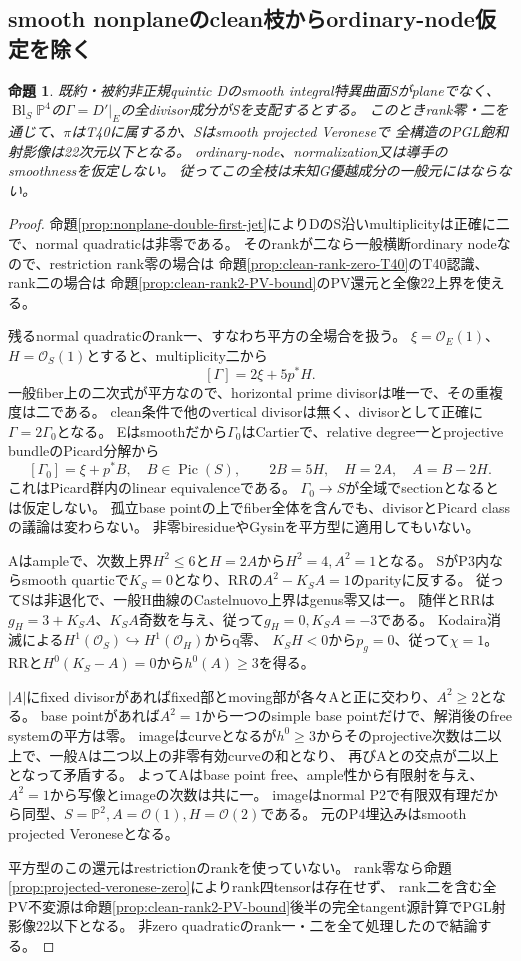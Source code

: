 \documentclass[a4paper,11pt]{ltjsarticle}
\newtheorem{proposition}{命題}[section]
\theoremstyle{definition}
\begin{document}
\subsection{smooth nonplaneのclean枝からordinary-node仮定を除く}
\begin{proposition}\label{prop:smooth-nonplane-clean-all}
既約・被約非正規quintic Dのsmooth integral特異曲面Sがplaneでなく、
$\operatorname{Bl}_S\mathbb P^4$の$\Gamma=D'|_E$の全divisor成分がSを支配するとする。
このときrank零・二を通じて、$\pi$はT40に属するか、Sはsmooth projected Veroneseで
全構造のPGL飽和射影像は22次元以下となる。
ordinary-node、normalization又は導手のsmoothnessを仮定しない。
従ってこの全枝は未知G優越成分の一般元にはならない。
\end{proposition}
\begin{proof}
命題\ref{prop:nonplane-double-first-jet}によりDのS沿いmultiplicityは正確に二で、normal quadraticは非零である。
そのrankが二なら一般横断ordinary nodeなので、restriction rank零の場合は
命題\ref{prop:clean-rank-zero-T40}のT40認識、rank二の場合は
命題\ref{prop:clean-rank2-PV-bound}のPV還元と全像22上界を使える。

残るnormal quadraticのrank一、すなわち平方の全場合を扱う。
$\xi=\mathcal O_E(1)$、$H=\mathcal O_S(1)$とすると、multiplicity二から
\[
 [\Gamma]=2\xi+5p^*H.
\]
一般fiber上の二次式が平方なので、horizontal prime divisorは唯一で、その重複度は二である。
clean条件で他のvertical divisorは無く、divisorとして正確に$\Gamma=2\Gamma_0$となる。
Eはsmoothだから$\Gamma_0$はCartierで、relative degree一とprojective bundleのPicard分解から
\[
 [\Gamma_0]=\xi+p^*B,\quad B\in\operatorname{Pic}(S),\qquad
 2B=5H,\quad H=2A,\quad A=B-2H.
\]
これはPicard群内のlinear equivalenceである。
$\Gamma_0\to S$が全域でsectionとなるとは仮定しない。
孤立base pointの上でfiber全体を含んでも、divisorとPicard classの議論は変わらない。
非零biresidueやGysinを平方型に適用してもいない。

Aはampleで、次数上界$H^2\le6$と$H=2A$から$H^2=4,A^2=1$となる。
SがP3内ならsmooth quarticで$K_S=0$となり、RRの$A^2-K_SA=1$のparityに反する。
従ってSは非退化で、一般H曲線のCastelnuovo上界はgenus零又は一。
随伴とRRは$g_H=3+K_SA$、$K_SA$奇数を与え、従って$g_H=0,K_SA=-3$である。
Kodaira消滅による$H^1(\mathcal O_S)\hookrightarrow H^1(\mathcal O_H)$からq零、
$K_SH<0$から$p_g=0$、従って$\chi=1$。
RRと$H^0(K_S-A)=0$から$h^0(A)\ge3$を得る。

$|A|$にfixed divisorがあればfixed部とmoving部が各々Aと正に交わり、$A^2\ge2$となる。
base pointがあれば$A^2=1$から一つのsimple base pointだけで、解消後のfree systemの平方は零。
imageはcurveとなるが$h^0\ge3$からそのprojective次数は二以上で、一般Aは二つ以上の非零有効curveの和となり、
再びAとの交点が二以上となって矛盾する。
よってAはbase point free、ample性から有限射を与え、$A^2=1$から写像とimageの次数は共に一。
imageはnormal P2で有限双有理だから同型、$S=\mathbb P^2,A=\mathcal O(1),H=\mathcal O(2)$である。
元のP4埋込みはsmooth projected Veroneseとなる。

平方型のこの還元はrestrictionのrankを使っていない。
rank零なら命題\ref{prop:projected-veronese-zero}によりrank四tensorは存在せず、
rank二を含む全PV不変源は命題\ref{prop:clean-rank2-PV-bound}後半の完全tangent源計算でPGL射影像22以下となる。
非zero quadraticのrank一・二を全て処理したので結論する。
\end{proof}
\end{document}
